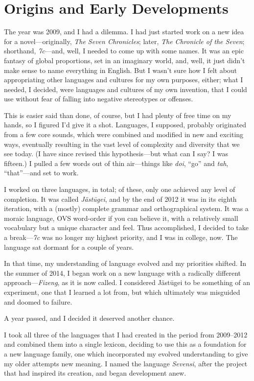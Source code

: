 \chapter{Origins and Early Developments}

The year was 2009, and I had a dilemma.
I had just started work on a new idea for a novel—originally, \emph{The Seven Chronicles}; later, \emph{The Chronicle of the Seven}; shorthand, \emph{7c}—and, well, I needed to come up with some names.
It was an epic fantasy of global proportions, set in an imaginary world, and, well, it just didn't make sense to name everything in English.
But I wasn't sure how I felt about appropriating other languages and cultures for my own purposes, either; what I needed, I decided, were languages and cultures of my own invention, that I could use without fear of falling into negative stereotypes or offenses.

This is easier said than done, of course, but I had plenty of free time on my hands, so I figured I'd give it a shot.
Languages, I supposed, probably originated from a few core sounds, which were combined and modified in new and exciting ways, eventually resulting in the vast level of complexity and diversity that we see today.
(I have since revised this hypothesis—but what can I say? I was fifteen.)
I pulled a few words out of thin air—things like \emph{doi}, “go” and \emph{tah}, “that”—and set to work.

I worked on three languages, in total; of these, only one achieved any level of completion.
It was called \emph{Jästūgei}, and by the end of 2012 it was in its eighth iteration, with a (mostly) complete grammar and orthographical system.
It was a moraic language, OVS word-order if you can believe it, with a relatively small vocabulary but a unique character and feel.
Thus accomplished, I decided to take a break—\emph{7c} was no longer my highest priority, and I was in college, now.
The language sat dormant for a couple of years.

In that time, my understanding of language evolved and my priorities shifted.
In the summer of 2014, I began work on a new language with a radically different approach—\emph{Fizeng}, as it is now called.
I considered Jästūgei to be something of an experiment, one that I learned a lot from, but which ultimately was misguided and doomed to failure.

A year passed, and I decided it deserved another chance.

I took all three of the languages that I had created in the period from 2009–2012 and combined them into a single lexicon, deciding to use this as a foundation for a new language family, one which incorporated my evolved understanding to give my older attempts new meaning.
I named the language \emph{Sevensi}, after the project that had inspired its creation, and began development anew.

